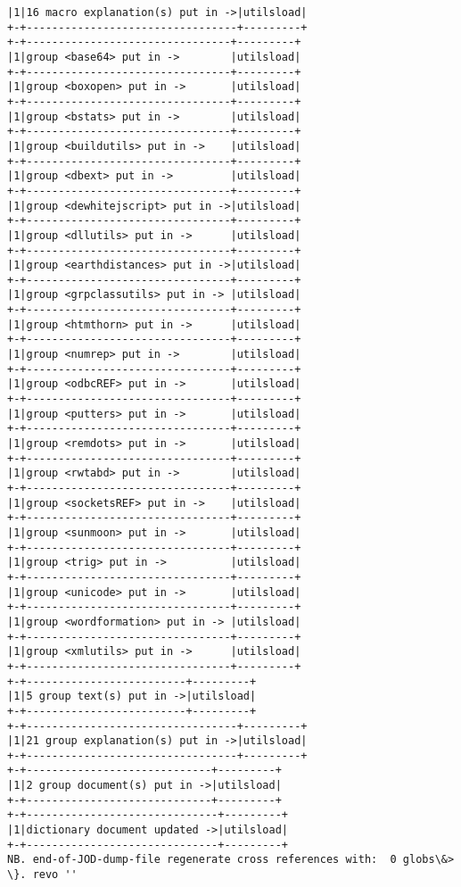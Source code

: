 \documentclass[11pt,letter,landscape]{article}
\begin{document}
\begin{Verbatim}[commandchars=\\\{\}]
|1|16 macro explanation(s) put in ->|utilsload|
+-+---------------------------------+---------+
+-+--------------------------------+---------+
|1|group <base64> put in ->        |utilsload|
+-+--------------------------------+---------+
|1|group <boxopen> put in ->       |utilsload|
+-+--------------------------------+---------+
|1|group <bstats> put in ->        |utilsload|
+-+--------------------------------+---------+
|1|group <buildutils> put in ->    |utilsload|
+-+--------------------------------+---------+
|1|group <dbext> put in ->         |utilsload|
+-+--------------------------------+---------+
|1|group <dewhitejscript> put in ->|utilsload|
+-+--------------------------------+---------+
|1|group <dllutils> put in ->      |utilsload|
+-+--------------------------------+---------+
|1|group <earthdistances> put in ->|utilsload|
+-+--------------------------------+---------+
|1|group <grpclassutils> put in -> |utilsload|
+-+--------------------------------+---------+
|1|group <htmthorn> put in ->      |utilsload|
+-+--------------------------------+---------+
|1|group <numrep> put in ->        |utilsload|
+-+--------------------------------+---------+
|1|group <odbcREF> put in ->       |utilsload|
+-+--------------------------------+---------+
|1|group <putters> put in ->       |utilsload|
+-+--------------------------------+---------+
|1|group <remdots> put in ->       |utilsload|
+-+--------------------------------+---------+
|1|group <rwtabd> put in ->        |utilsload|
+-+--------------------------------+---------+
|1|group <socketsREF> put in ->    |utilsload|
+-+--------------------------------+---------+
|1|group <sunmoon> put in ->       |utilsload|
+-+--------------------------------+---------+
|1|group <trig> put in ->          |utilsload|
+-+--------------------------------+---------+
|1|group <unicode> put in ->       |utilsload|
+-+--------------------------------+---------+
|1|group <wordformation> put in -> |utilsload|
+-+--------------------------------+---------+
|1|group <xmlutils> put in ->      |utilsload|
+-+--------------------------------+---------+
+-+-------------------------+---------+
|1|5 group text(s) put in ->|utilsload|
+-+-------------------------+---------+
+-+---------------------------------+---------+
|1|21 group explanation(s) put in ->|utilsload|
+-+---------------------------------+---------+
+-+-----------------------------+---------+
|1|2 group document(s) put in ->|utilsload|
+-+-----------------------------+---------+
+-+------------------------------+---------+
|1|dictionary document updated ->|utilsload|
+-+------------------------------+---------+
NB. end-of-JOD-dump-file regenerate cross references with:  0 globs\&> \}. revo '' 

    \end{Verbatim}
\end{document}
